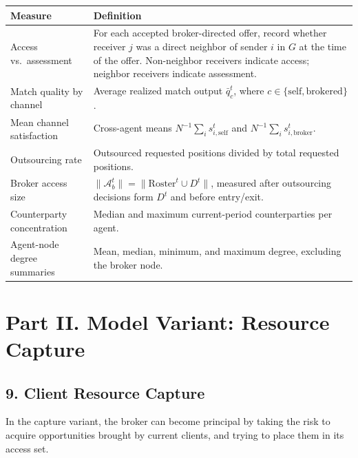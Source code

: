 \documentclass[11pt]{article}
\begin{document}
{
\begin{longtable}[]{@{}
  >{\raggedright\arraybackslash}p{}
  >{\raggedright\arraybackslash}p{}@{}}
\toprule\noalign{}
\begin{minipage}[b]{\linewidth}\raggedright
Measure
\end{minipage} & \begin{minipage}[b]{\linewidth}\raggedright
Definition
\end{minipage} \\
\midrule\noalign{}
\endhead
\bottomrule\noalign{}
\endlastfoot
Access vs.~assessment & For each accepted broker-directed offer, record whether receiver \(j\) was a direct neighbor of sender \(i\) in \(G\) at the time of the offer. Non-neighbor receivers indicate access; neighbor receivers indicate assessment. \\
Match quality by channel & Average realized match output \(\bar{q}_c^t\), where \(c \in \{\text{self}, \text{brokered}\}\). \\
Mean channel satisfaction & Cross-agent means \(N^{-1}\sum_i s_{i,\text{self}}^t\) and \(N^{-1}\sum_i s_{i,\text{broker}}^t\). \\
Outsourcing rate & Outsourced requested positions divided by total requested positions. \\
Broker access size & \(\|\mathcal{A}_b^t\| = \|\text{Roster}^t \cup D^t\|\), measured after outsourcing decisions form \(D^t\) and before entry/exit. \\
Counterparty concentration & Median and maximum current-period counterparties per agent. \\
Agent-node degree summaries & Mean, median, minimum, and maximum degree, excluding the broker node. \\
\end{longtable}
}

\section{Part II. Model Variant: Resource Capture}\label{part-ii.-model-variant-resource-capture}

\subsection{9. Client Resource Capture}\label{client-resource-capture}

In the capture variant, the broker can become principal by taking the risk to acquire opportunities brought by current clients, and trying to place them in its access set.
\end{document}
